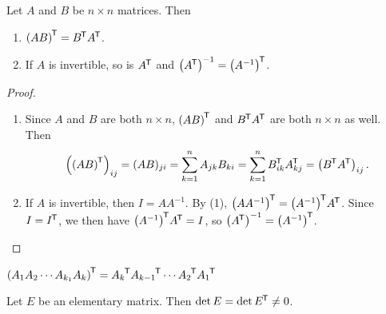 \begin{thm}\label{transpose-properties}
    Let $A$ and $B$ be $n \times n$ matrices. Then
    \begin{enumerate}[label=(\arabic*)]
        \item ${\left(AB\right)}^{\mkern-1.5mu\mathsf{T}} = {B}^{\mkern-1.5mu\mathsf{T}}{A}^{\mkern-1.5mu\mathsf{T}}$.
        \item If $A$ is invertible, so is ${A}^{\mkern-1.5mu\mathsf{T}}$ and $\left({A}^{\mkern-1.5mu\mathsf{T}}\right)^{-1} = {\left(A^{-1}\right)}^{\mkern-1.5mu\mathsf{T}}$.
    \end{enumerate}
\end{thm}

\begin{proof}\proofbreak
    \begin{enumerate}[label=(\arabic*)]
        \item Since $A$ and $B$ are both $n \times n$, ${(AB)}^{\mkern-1.5mu\mathsf{T}}$ and ${B}^{\mkern-1.5mu\mathsf{T}}{A}^{\mkern-1.5mu\mathsf{T}}$ are both $n \times n$ as well. Then \[\left({\left(AB\right)}^{\mkern-1.5mu\mathsf{T}}\right)_{ij} = (AB)_{ji} = \sum_{k=1}^{n}A_{jk}B_{ki} = \sum_{k=1}^{n}{B}^{\mkern-1.5mu\mathsf{T}}_{ik}{A}^{\mkern-1.5mu\mathsf{T}}_{kj} = \left({B}^{\mkern-1.5mu\mathsf{T}}{A}^{\mkern-1.5mu\mathsf{T}}\right)_{ij}.\]
        \item If $A$ is invertible, then $I = AA^{-1}$. By (1), ${\left(AA^{-1}\right)}^{\mkern-1.5mu\mathsf{T}} = {\left(A^{-1}\right)}^{\mkern-1.5mu\mathsf{T}}{A}^{\mkern-1.5mu\mathsf{T}}$. Since $I = {I}^{\mkern-1.5mu\mathsf{T}}$, we then have ${\left(A^{-1}\right)}^{\mkern-1.5mu\mathsf{T}}{A}^{\mkern-1.5mu\mathsf{T}} = I$, so $\left({A}^{\mkern-1.5mu\mathsf{T}}\right)^{-1} = {\left(A^{-1}\right)}^{\mkern-1.5mu\mathsf{T}}$.
    \end{enumerate}
\end{proof}

\begin{cor}\label{transpose-of-product}
    ${\left(A_1A_2\cdots A_{k_1}A_k\right)}^{\mkern-1.5mu\mathsf{T}} = {A_k}^{\mkern-1.5mu\mathsf{T}}{A_{k-1}}^{\mkern-1.5mu\mathsf{T}}\cdots {A_2}^{\mkern-1.5mu\mathsf{T}}{A_1}^{\mkern-1.5mu\mathsf{T}}$
\end{cor}

\begin{lemma}\label{elementary-transpose-determinant}
    Let $E$ be an elementary matrix. Then $\det E = \det{E}^{\mkern-1.5mu\mathsf{T}} \neq 0$.
\end{lemma}

